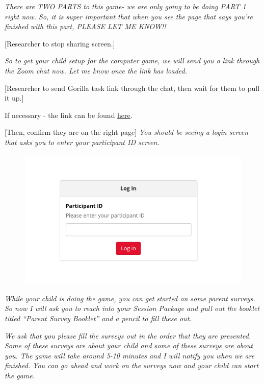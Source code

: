 \documentclass[]{book}
\begin{document}
\emph{There are TWO PARTS to this game- we are only going to be doing PART 1 right now. So, it is super important that when you see the page that says you're finished with this part, PLEASE LET ME KNOW!!}

{[}Researcher to stop sharing screen.{]}

\emph{So to get your child setup for the computer game, we will send you a link through the Zoom chat now. Let me know once the link has loaded.}

{[}Researcher to send Gorilla task link through the chat, then wait for them to pull it up.{]}

If necessary - the link can be found \href{https://research.sc/participant/login/20451/publicid}{here}.

{[}Then, confirm they are on the right page{]} \emph{You should be seeing a login screen that asks you to enter your participant ID screen.}

\begin{figure}
\centering
\includegraphics{images/halloween/7.png}
\caption{}
\end{figure}

\emph{While your child is doing the game, you can get started on some parent surveys. So now I will ask you to reach into your Session Package and pull out the booklet titled ``Parent Survey Booklet'' and a pencil to fill these out.}

\emph{We ask that you please fill the surveys out in the order that they are presented. Some of these surveys are about your child and some of these surveys are about you. The game will take around 5-10 minutes and I will notify you when we are finished. You can go ahead and work on the surveys now and your child can start the game.}
\end{document}
